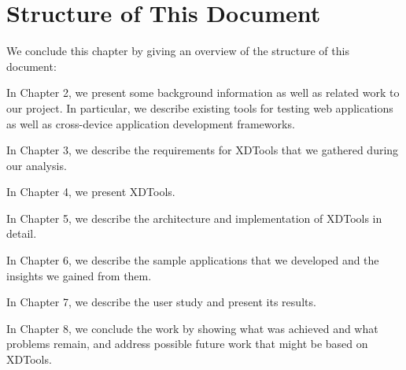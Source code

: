 \section{Structure of This Document}

We conclude this chapter by giving an overview of the structure of this document:

In Chapter 2, we present some background information as well as related work to our project. In particular, we describe existing tools for testing web applications as well as cross-device application development frameworks.

In Chapter 3, we describe the requirements for XDTools that we gathered during our analysis.

In Chapter 4, we present XDTools.

In Chapter 5, we describe the architecture and implementation of XDTools in detail.

In Chapter 6, we describe the sample applications that we developed and the insights we gained from them.

In Chapter 7, we describe the user study and present its results.

In Chapter 8, we conclude the work by showing what was achieved and what problems remain, and address possible future work that might be based on XDTools.